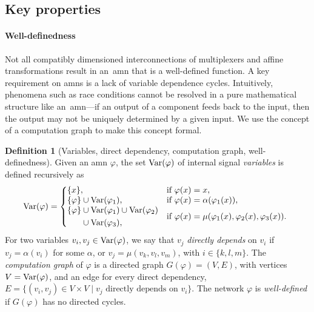 \documentclass[10pt]{article}
\newcommand{\amn}{\varphi}
\newcommand{\Var}{\mathop{\rm Var}}
\theoremstyle{remark}
\theoremstyle{definition}
\newtheorem{definition}{Definition}
\theoremstyle{plain}
\begin{document}
\subsection{Key properties}
\paragraph{Well-definedness}
Not all compatibly dimensioned interconnections of multiplexers and affine
transformations result in an~\acs{amn} that is a well-defined function. A key
requirement on \acsp{amn} is a lack of variable dependence cycles.
Intuitively, phenomena such as race conditions cannot be resolved in a pure
mathematical structure like an~\acs{amn}---if an output of a component feeds
back to the input, then the output may not be uniquely determined by a given
input. We use the concept of a computation graph to make this concept formal.

\begin{definition}[Variables, direct dependency, computation graph, well-definedness]
Given an \acs{amn} $\amn$, the set $\Var(\amn)$ of internal signal
\emph{variables} is defined recursively as
\[
	\Var(\amn) = \left\{\hspace{-0.5em}
	\begin{array}{ll}
		\{x\}, & \text{if }\amn(x) = x,\\
		\{\amn\} \cup \Var(\amn_1), & \text{if }\amn(x) = \alpha(\amn_1(x)),\\
		\begin{aligned}
			\{\amn\} &\cup \Var(\amn_1)
			         \cup \Var(\amn_2) \\
					 &\cup \Var(\amn_3), 
		\end{aligned}	
		& \text{if }\amn(x)=\mu(\amn_1(x),\amn_2(x),\amn_3(x)).
	\end{array}
	\right.
\]
For two variables $v_i,v_j\in\Var(\amn)$, we say that $v_j$
\emph{directly depends} on $v_i$ if 
$v_j=\alpha(v_i)$
for some $\alpha$, or 
$v_j=\mu(v_k,v_l,v_m)$, with $i\in\{k,l,m\}$.
The \emph{computation graph} of $\amn$ is a directed graph $G(\amn)=(V,E)$,
with vertices $V=\Var(\amn)$,
and an edge for every direct dependency, 
$E=\{(v_i,v_j) \in V\times V \mid v_j \text{ directly depends on } v_i\}$. 
The network $\amn$ is \emph{well-defined} if $G(\amn)$ has no directed cycles.
\end{definition}
\end{document}
